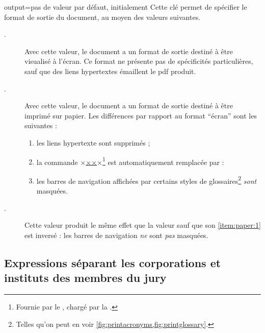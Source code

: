 \begin{docKey}{output}{=\textbar{}\textbar{}}{pas
    de valeur par défaut, initialement }
  Cette clé permet de spécifier le format de sortie du document, au moyen des
  valeurs suivantes.
  \begin{description}
  \item[.] Avec cette valeur, le document a un format de
    sortie destiné à être visualisé à l'écran. Ce format ne présente pas de
    spécificités particulières, sauf que des liens hypertextes émaillent le
    \acrshort{pdf} produit.
  \item[.] Avec cette valeur, le document a un format de sortie
    destiné à être imprimé sur papier. Les différences par rapport au format
    \enquote{écran} sont les suivantes :
    \begin{enumerate}
    \item les liens hypertexte sont supprimés ;
    \item la commande
      ×\href{×\meta{\acrshort*{url}}×}{××}×\footnote{Fournie par le
        , chargé par la \yatcl{}.} est automatiquement
      remplacée par :
    \item\label{item:paper:1} les barres de navigation affichées par certains
      styles de glossaires\footnote{Telles qu'on peut en voir
        \vref{fig:printacronyms,fig:printglossary}.} \emph{sont} masquées.
    \end{enumerate}
  \item[.] Cette valeur produit le même effet que la valeur
     sauf que son \vref{item:paper:1} est inversé : les barres
    de navigation \emph{ne} sont \emph{pas} masquées.
  \end{description}
\end{docKey}

\subsection{Expressions séparant les corporations et instituts des membres
  du jury}
\label{sec:expr-separ-les}

